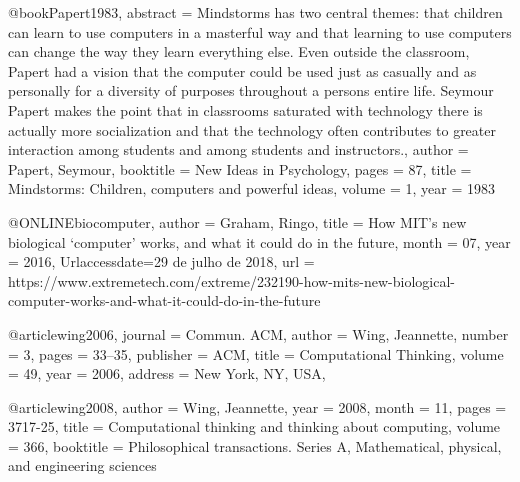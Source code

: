 
@book{Papert1983,
	abstract = {Mindstorms has two central themes: that children can learn to use computers in a masterful way and that learning to use computers can change the way they learn everything else. Even outside the classroom, Papert had a vision that the computer could be used just as casually and as personally for a diversity of purposes throughout a persons entire life. Seymour Papert makes the point that in classrooms saturated with technology there is actually more socialization and that the technology often contributes to greater interaction among students and among students and instructors.},
	author = {Papert, Seymour},
	booktitle = {New Ideas in Psychology},
	pages = {87},
	title = {{Mindstorms: Children, computers and powerful ideas}},
	volume = {1},
	year = {1983}
}

@ONLINE{biocomputer,
	author = {Graham, Ringo},
	title = {How MIT’s new biological ‘computer’ works, and what it could do in the future},
	month = {07},
	year = {2016},
	Urlaccessdate={29 de julho de 2018},
	url = {https://www.extremetech.com/extreme/232190-how-mits-new-biological-computer-works-and-what-it-could-do-in-the-future}
}


@article{wing2006,
	journal = {Commun. ACM},
	author = {Wing, Jeannette},
	number = {3},
	pages = {33--35},
	publisher = {ACM},
	title = {{Computational Thinking}},
	volume = {49},
	year = {2006},
	address = {New York, NY, USA},
}

@article{wing2008,
	author = {Wing, Jeannette},
	year = {2008},
	month = {11},
	pages = {3717-25},
	title = {Computational thinking and thinking about computing},
	volume = {366},
	booktitle = {Philosophical transactions. Series A, Mathematical, physical, and engineering sciences}
}



